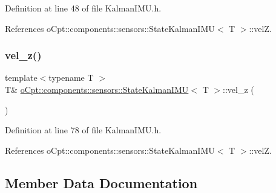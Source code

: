 Definition at line 48 of file Kalman\+I\+M\+U.\+h.



References o\+Cpt\+::components\+::sensors\+::\+State\+Kalman\+I\+M\+U$<$ T $>$\+::velZ.

\hypertarget{classo_cpt_1_1components_1_1sensors_1_1_state_kalman_i_m_u_a43c6fd528cc8acaf419c78ca7b98b9a4}{}\label{classo_cpt_1_1components_1_1sensors_1_1_state_kalman_i_m_u_a43c6fd528cc8acaf419c78ca7b98b9a4} 
\subsubsection{\texorpdfstring{vel\+\_\+z()}{vel\_z()}\hspace{0.1cm}{\footnotesize\ttfamily [2/2]}}
{\footnotesize\ttfamily template$<$typename T $>$ \\
T\& \hyperlink{classo_cpt_1_1components_1_1sensors_1_1_state_kalman_i_m_u}{o\+Cpt\+::components\+::sensors\+::\+State\+Kalman\+I\+MU}$<$ T $>$\+::vel\+\_\+z (\begin{DoxyParamCaption}{ }\end{DoxyParamCaption})\hspace{0.3cm}{\ttfamily [inline]}}



Definition at line 78 of file Kalman\+I\+M\+U.\+h.



References o\+Cpt\+::components\+::sensors\+::\+State\+Kalman\+I\+M\+U$<$ T $>$\+::velZ.



\subsection{Member Data Documentation}
\hypertarget{classo_cpt_1_1components_1_1sensors_1_1_state_kalman_i_m_u_a3453cb371171d6753dc93ab75b350c6c}{}\label{classo_cpt_1_1components_1_1sensors_1_1_state_kalman_i_m_u_a3453cb371171d6753dc93ab75b350c6c} 
